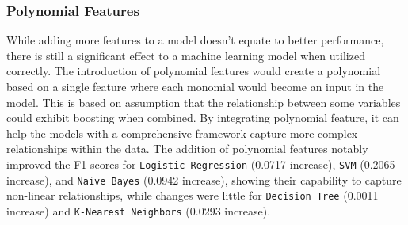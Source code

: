 \subsubsection{Polynomial Features}

While adding more features to a model doesn't equate to better performance, there is still a significant effect to a machine learning model when utilized correctly. The introduction of polynomial features would create a polynomial based on a single feature where each monomial would become an input in the model. This is based on assumption that the relationship between some variables could exhibit boosting when combined. By integrating polynomial feature, it can help the models with a comprehensive framework capture more complex relationships within the data. The addition of polynomial features notably improved the F1 scores for \texttt{Logistic Regression} (0.0717 increase), \texttt{SVM} (0.2065 increase), and \texttt{Naive Bayes} (0.0942 increase), showing their capability to capture non-linear relationships, while changes were little for \texttt{Decision Tree} (0.0011 increase) and \texttt{K-Nearest Neighbors} (0.0293 increase).

